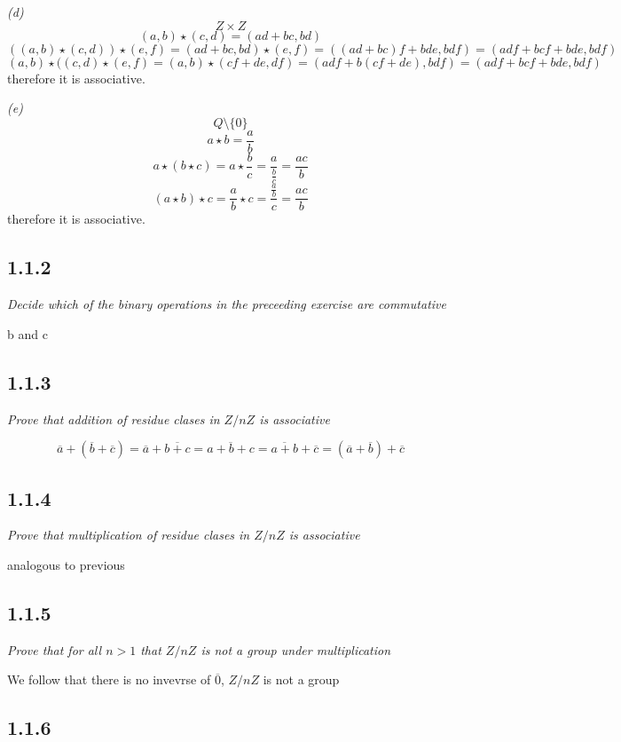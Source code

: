 \documentclass[11pt,oneside,titlepage]{book}
\begin{document}
\textit{(d) }
$$Z \times Z$$ 
$$(a, b) \star (c, d) = (ad + bc, bd)$$
$$((a, b) \star (c, d)) \star (e, f) = (ad + bc, bd) \star (e, f) =
((ad + bc) f + bde, bdf) = (adf + bcf + bde, bdf) $$
$$(a, b) \star ((c, d) \star (e, f) = (a, b) \star (cf + de, df) =
(adf + b(cf + de), bdf) = (adf + bcf + bde, bdf)$$
therefore it is associative.

\textit{(e) }
$$Q \setminus \{0\}$$ 
$$a \star b = \frac{a}{b}$$
$$a \star (b \star c) = a \star \frac b c = \frac{a}{\frac{b}{c}} = \frac{ac}{b}$$
$$(a \star b) \star c = \frac{a}{b} \star c = \frac{\frac{a}{b}}{c} = \frac{ac}{b}$$
therefore it is associative.

\subsection*{1.1.2}

\textit{Decide which of the binary operations in the preceeding exercise are commutative}

b and c

\subsection*{1.1.3}

\textit{Prove that addition of residue clases in $Z/nZ$ is associative}

$$\overline{a} + (\overline{b} + \overline{c}) = \overline a + \overline{b + c} =
\overline{a + b + c} = \overline{a + b} + \overline{c} = (\overline{a} + \overline{b} ) +
\overline{c}$$

\subsection*{1.1.4}

\textit{Prove that multiplication of residue clases in $Z/nZ$ is associative}

analogous to previous

\subsection*{1.1.5}

\textit{Prove that for all $n > 1$ that $Z/nZ$ is not a group under multiplication}

We follow that there is no invevrse of $\overline{0}$, $Z/nZ$ is not a group

\subsection*{1.1.6}
\end{document}
